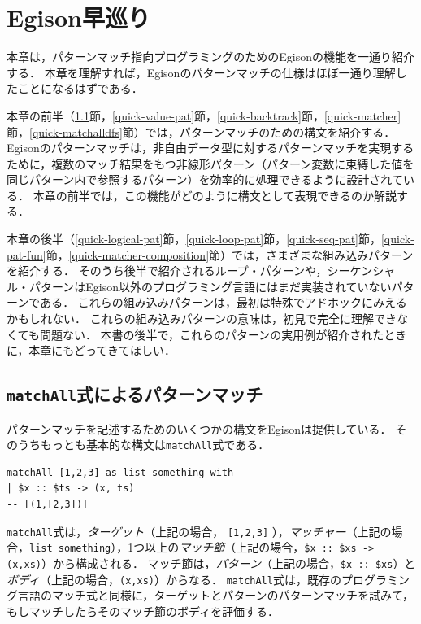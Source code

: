 \chapter{Egison早巡り}\label{quick}

本章は，パターンマッチ指向プログラミングのためのEgisonの機能を一通り紹介する．
本章を理解すれば，Egisonのパターンマッチの仕様はほぼ一通り理解したことになるはずである．

本章の前半（\ref{quick-matchall}節，\ref{quick-value-pat}節，\ref{quick-backtrack}節，\ref{quick-matcher}節，\ref{quick-matchalldfs}節）では，パターンマッチのための構文を紹介する．
Egisonのパターンマッチは，非自由データ型に対するパターンマッチを実現するために，複数のマッチ結果をもつ非線形パターン（パターン変数に束縛した値を同じパターン内で参照するパターン）を効率的に処理できるように設計されている．
本章の前半では，この機能がどのように構文として表現できるのか解説する．

本章の後半（\ref{quick-logical-pat}節，\ref{quick-loop-pat}節，\ref{quick-seq-pat}節，\ref{quick-pat-fun}節，\ref{quick-matcher-composition}節）では，さまざまな組み込みパターンを紹介する．
そのうち後半で紹介されるループ・パターンや，シーケンシャル・パターンはEgison以外のプログラミング言語にはまだ実装されていないパターンである．
これらの組み込みパターンは，最初は特殊でアドホックにみえるかもしれない．
これらの組み込みパターンの意味は，初見で完全に理解できなくても問題ない．
本書の後半で，これらのパターンの実用例が紹介されたときに，本章にもどってきてほしい．

\section{\texttt{matchAll}式によるパターンマッチ}\label{quick-matchall}

パターンマッチを記述するためのいくつかの構文をEgisonは提供している．
そのうちもっとも基本的な構文は\lstinline{matchAll}式である．
\begin{lstlisting}[language=egison,numbers=none]
matchAll [1,2,3] as list something with
| $x :: $ts -> (x, ts)
-- [(1,[2,3])]
\end{lstlisting}
\lstinline{matchAll}式は，\emph{ターゲット}（上記の場合， \lstinline{[1,2,3]} ），\emph{マッチャー}（上記の場合，\lstinline{list something}），1つ以上の\emph{マッチ節}（上記の場合，\lstinline{$x :: $xs -> (x,xs)}）から構成される．
マッチ節は，\emph{パターン}（上記の場合，\lstinline{$x :: $xs}）と\emph{ボディ}（上記の場合，\lstinline{(x,xs)}）からなる．
\lstinline{matchAll}式は，既存のプログラミング言語のマッチ式と同様に，ターゲットとパターンのパターンマッチを試みて，もしマッチしたらそのマッチ節のボディを評価する．

